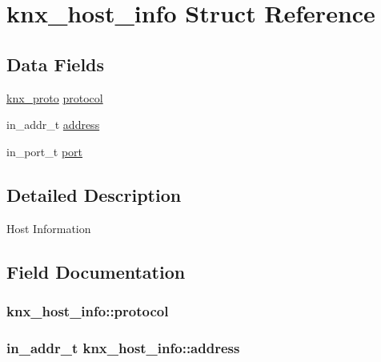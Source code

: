 \hypertarget{structknx__host__info}{}\section{knx\+\_\+host\+\_\+info Struct Reference}
\label{structknx__host__info}
\subsection*{Data Fields}
\begin{DoxyCompactItemize}
\item 
\hyperlink{hostinfo_8h_ab439fac16def983553605200db4e65e8}{knx\+\_\+proto} \hyperlink{structknx__host__info_aff5dc711853888a2d46fe2e0f2db16fc}{protocol}
\item 
in\+\_\+addr\+\_\+t \hyperlink{structknx__host__info_a981b4f63bb6c8c7c41c40061f1e5ec23}{address}
\item 
in\+\_\+port\+\_\+t \hyperlink{structknx__host__info_a48c44f6dca880046f25cd70d3e808735}{port}
\end{DoxyCompactItemize}


\subsection{Detailed Description}
Host Information 

\subsection{Field Documentation}
\subsubsection[{\texorpdfstring{protocol}{protocol}}]{ knx\+\_\+host\+\_\+info\+::protocol}\hypertarget{structknx__host__info_aff5dc711853888a2d46fe2e0f2db16fc}{}\label{structknx__host__info_aff5dc711853888a2d46fe2e0f2db16fc}
\subsubsection[{\texorpdfstring{address}{address}}]{\setlength{\rightskip}{0pt plus 5cm}in\+\_\+addr\+\_\+t knx\+\_\+host\+\_\+info\+::address}\hypertarget{structknx__host__info_a981b4f63bb6c8c7c41c40061f1e5ec23}{}\label{structknx__host__info_a981b4f63bb6c8c7c41c40061f1e5ec23}
